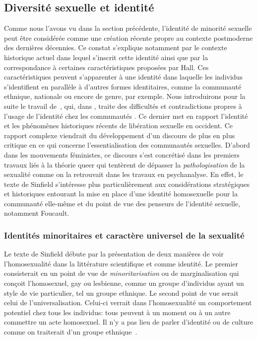 \subsection{Diversité sexuelle et identité}
\label{sec:diversit_sexuelle_et_identit_} Comme nous l'avons vu dans la section précédente, l'identité de minorité sexuelle peut être considérée comme une création récente propre au contexte postmoderne des dernières décennies. 
Ce constat s'explique notamment par le contexte historique actuel dans lequel s'inscrit cette identité ainsi que par la correspondance à certaines caractéristiques proposées par Hall. 
Ces caractéristiques peuvent s'apparenter à une identité dans laquelle les individus s'identifient en parallèle à d'autres formes identitaires, comme la communauté ethnique, nationale ou encore de genre, par exemple.
Nous introduirons pour la suite le travail de~\citet{Sinfield1996}, qui, dans , traite des difficultés et contradictions propres à l'usage de l'identité chez les communautés \lgbt{}.
Ce dernier met en rapport l'identité et les phénomènes historiques récents de libération sexuelle en occident.
Ce rapport complexe viendrait du développement d'un discours de plus en plus critique en ce qui concerne l'essentialisation des communautés sexuelles.
D'abord dans les mouvements féministes, ce discours s'est concrétisé dans les premiers travaux liés à la théorie queer qui tentèrent de dépasser la \emph{pathologisation} de la sexualité comme on la retrouvait dans les travaux en psychanalyse. 
En effet, le texte de Sinfield s'intéresse plus particulièrement aux considérations stratégiques et historiques entourant la mise en place d'une identité homosexuelle pour la communauté elle-même et du point de vue des penseurs de l'identité sexuelle, notamment Foucault.

\subsubsection{Identités minoritaires et caractère universel de la sexualité}
\label{sub:minorit_s_et_universel}
Le texte de Sinfield débute par la présentation de deux manières de voir l'homosexualité dans la littérature scientifique et comme identité.
Le premier consisterait en un point de vue de \emph{minoritarisation} ou de marginalisation qui conçoit l'homosexuel, gay ou lesbienne, comme un groupe d'individus ayant un style de vie particulier, tel un groupe ethnique.
Le second point de vue serait celui de l'universalisation. 
Celui-ci verrait dans l'homosexualité un comportement potentiel chez tous les individus: tous peuvent à un moment ou à un autre commettre un acte homosexuel. 
Il n'y a pas lieu de parler d'identité ou de culture comme on traiterait d'un groupe ethnique~\citep[271]{Sinfield1996}.

